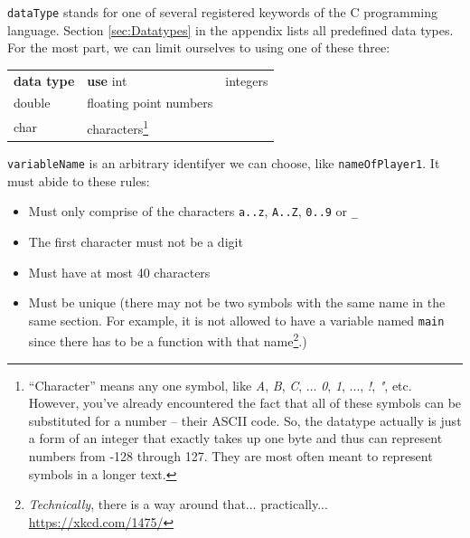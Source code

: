 \texttt{dataType} stands for one of several registered keywords of the C programming language. Section \ref{sec:Datatypes} in the appendix lists all predefined data types. For the most part, we can limit ourselves to using one of these three:
\begin{center}

\begin{tabularx}
	{.5505\linewidth}
	{TU}
\toprule[1.5pt]
	\textbf{\textrm{data type}} & \textbf{use} \tabcrlf
	int                         & integers \\
	double                      & floating point numbers \\
	char                        & characters\footnote{
		\enquote{Character} means any one symbol, like \emph{A}, \emph{B}, \emph{C}, ... \emph{0}, \emph{1}, ..., \emph{!}, \emph{"}, etc. However, you've already encountered the fact that all of these
		symbols can be substituted for a number -- their ASCII code. So, the datatype  actually is just a form of an integer that exactly takes up one byte and thus can 
		represent numbers from -128 through 127. They are most often meant to represent symbols in a longer text.
	} \\
\bottomrule[1.5pt]
\end{tabularx}
\end{center}

\texttt{variableName} is an arbitrary identifyer we can choose, like \texttt{nameOfPlayer1}. It must abide to these rules: \vspace{-9pt}
\begin{itemize}
\item Must only comprise of the characters \texttt{a..z}, \texttt{A..Z}, \texttt{0..9} or \texttt{\_}
\item The first character must not be a digit
\item Must have at most 40 characters
\item Must be unique (there may not be two symbols with the same name in the same section. For example, it is not allowed to have a variable named \texttt{main} 
	since there has to be a function with that name\footnote{\emph{Technically}, there is a way around that... practically... \url{https://xkcd.com/1475/}}.)
\end{itemize}
\vspace{-8pt}

